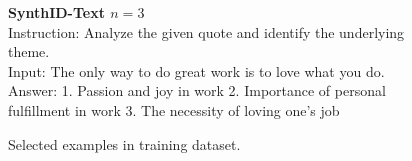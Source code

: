 \begin{figure*}[h!]
\begin{tcolorbox}[colback=gray!10, colframe=black, rounded corners]
\textbf{SynthID-Text $n=3$} \\[0.5em]
Instruction: Analyze the given quote and identify the underlying theme.\\
Input: The only way to do great work is to love what you do.\\
Answer: 1. Passion and joy in work 2. Importance of personal fulfillment in work 3. The necessity of loving one's job\\

\end{tcolorbox}
\caption{Selected examples in training dataset.}
\label{fig:training_data}
\vspace{-15pt}
\end{figure*}